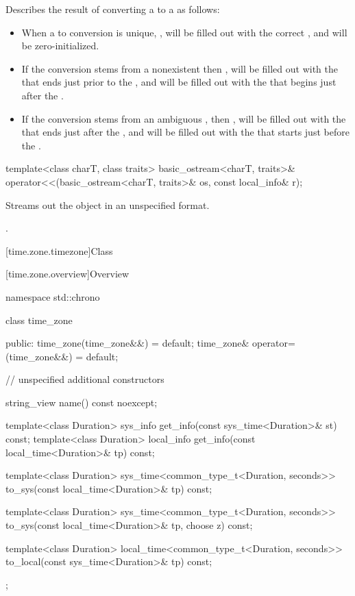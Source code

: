 \pnum
Describes the result of converting a  to a 
as follows:
\begin{itemize}
\item
When a  to  conversion is unique,
,
 will be filled out with the correct ,
and
 will be zero-initialized.

\item
If the conversion stems from a nonexistent 
then ,
 will be filled out with the 
that ends just prior to the ,
and
 will be filled out with the 
that begins just after the .

\item
If the conversion stems from an ambiguous ,
then ,
 will be filled out with the 
that ends just after the ,
and
 will be filled out with the 
that starts just before the .
\end{itemize}

%
\begin{itemdecl}
template<class charT, class traits>
  basic_ostream<charT, traits>&
    operator<<(basic_ostream<charT, traits>& os, const local_info& r);
\end{itemdecl}

\begin{itemdescr}
\pnum
\effects
Streams out the  object  in an unspecified format.

\pnum
\returns
{}.
\end{itemdescr}

[time.zone.timezone]{Class }

[time.zone.overview]{Overview}

\begin{codeblock}
namespace std::chrono {
  class time_zone {
  public:
    time_zone(time_zone&&) = default;
    time_zone& operator=(time_zone&&) = default;

    // unspecified additional constructors

    string_view name() const noexcept;

    template<class Duration> sys_info   get_info(const sys_time<Duration>& st)   const;
    template<class Duration> local_info get_info(const local_time<Duration>& tp) const;

    template<class Duration>
      sys_time<common_type_t<Duration, seconds>>
        to_sys(const local_time<Duration>& tp) const;

    template<class Duration>
      sys_time<common_type_t<Duration, seconds>>
        to_sys(const local_time<Duration>& tp, choose z) const;

    template<class Duration>
      local_time<common_type_t<Duration, seconds>>
        to_local(const sys_time<Duration>& tp) const;
  };
}
\end{codeblock}

